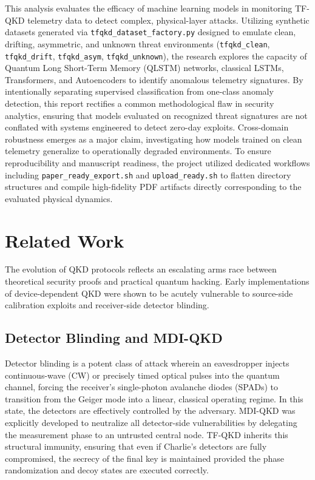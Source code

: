 \documentclass[conference]{IEEEtran}
\begin{document}
This analysis evaluates the efficacy of machine learning models in monitoring TF-QKD telemetry data to detect complex, physical-layer attacks. Utilizing synthetic datasets generated via \texttt{tfqkd\_dataset\_factory.py} designed to emulate clean, drifting, asymmetric, and unknown threat environments (\texttt{tfqkd\_clean}, \texttt{tfqkd\_drift}, \texttt{tfqkd\_asym}, \texttt{tfqkd\_unknown}), the research explores the capacity of Quantum Long Short-Term Memory (QLSTM) networks, classical LSTMs, Transformers, and Autoencoders to identify anomalous telemetry signatures. By intentionally separating supervised classification from one-class anomaly detection, this report rectifies a common methodological flaw in security analytics, ensuring that models evaluated on recognized threat signatures are not conflated with systems engineered to detect zero-day exploits. Cross-domain robustness emerges as a major claim, investigating how models trained on clean telemetry generalize to operationally degraded environments. To ensure reproducibility and manuscript readiness, the project utilized dedicated workflows including \texttt{paper\_ready\_export.sh} and \texttt{upload\_ready.sh} to flatten directory structures and compile high-fidelity PDF artifacts directly corresponding to the evaluated physical dynamics.

\section{Related Work}

The evolution of QKD protocols reflects an escalating arms race between theoretical security proofs and practical quantum hacking. Early implementations of device-dependent QKD were shown to be acutely vulnerable to source-side calibration exploits and receiver-side detector blinding. 

\subsection{Detector Blinding and MDI-QKD}
Detector blinding is a potent class of attack wherein an eavesdropper injects continuous-wave (CW) or precisely timed optical pulses into the quantum channel, forcing the receiver's single-photon avalanche diodes (SPADs) to transition from the Geiger mode into a linear, classical operating regime. In this state, the detectors are effectively controlled by the adversary. MDI-QKD was explicitly developed to neutralize all detector-side vulnerabilities by delegating the measurement phase to an untrusted central node. TF-QKD inherits this structural immunity, ensuring that even if Charlie's detectors are fully compromised, the secrecy of the final key is maintained provided the phase randomization and decoy states are executed correctly.
\end{document}
